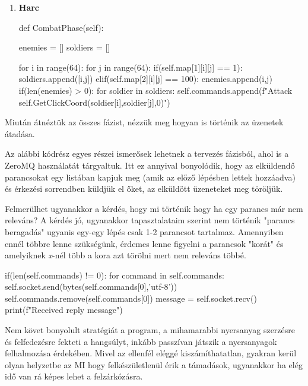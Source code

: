 \begin{enumerate}
    \item \textbf{Harc}
    
    \begin{python}
def CombatPhase(self):

    enemies = []
    soldiers = []

    for i in range(64):
        for j in range(64):
            if(self.map[1][i][j] == 1):
                soldiers.append([i,j])
            elif(self.map[2][i][j] == 100):
                enemies.append(i,j)
    if(len(enemies) > 0):
        for soldier in soldiers:
            self.commands.append(f"Attack 
                    {self.GetClickCoord(soldier[i],soldier[j],0)}")

    \end{python}

\end{enumerate}


Miután átnéztük az összes fázist, nézzük meg hogyan is történik az üzenetek átadása.

Az alábbi kódrész egyes részei ismerősek lehetnek a tervezés fázisból, ahol is a ZeroMQ használatát tárgyaltuk. Itt ez annyival bonyolódik, hogy az elküldendő parancsokat egy listában kapjuk meg (amik az előző lépésben lettek hozzáadva) és érkezési sorrendben küldjük el őket, az elküldött üzeneteket meg töröljük.

Felmerülhet ugyanakkor a kérdés, hogy mi történik hogy ha egy parancs már nem releváns? A kérdés jó, ugyanakkor tapasztalataim szerint nem történik "parancs beragadás" ugyanis egy-egy lépés csak 1-2 parancsot tartalmaz. Amennyiben ennél többre lenne szükségünk, érdemes lenne figyelni a parancsok "korát" és amelyiknek \textit{x}-nél több a kora azt törölni mert nem releváns többé.

\begin{python}
if(len(self.commands) != 0):
    for command in self.commands:
        self.socket.send(bytes(self.commands[0],'utf-8'))
        self.commands.remove(self.commands[0])
        message = self.socket.recv()
        print(f"Received reply {message}")
\end{python}


Nem követ bonyolult stratégiát a program, a mihamarabbi nyersanyag szerzésre és felfedezésre fekteti a hangsúlyt, inkább passzívan játszik a nyersanyagok felhalmozása érdekében. Mivel az ellenfél eléggé kiszámíthatatlan, gyakran kerül olyan helyzetbe az MI hogy felkészületlenül érik a támadások, ugyanakkor ha elég idő van rá képes lehet a felzárkózásra.

